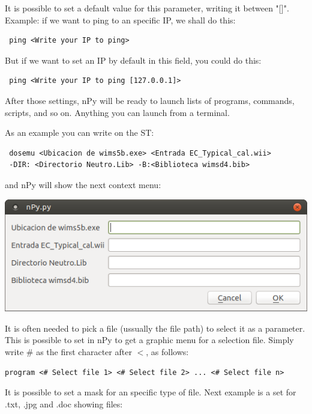 \documentclass[a4paper,10pt]{article}
\begin{document}
It is possible to set a default value for this parameter, writing it between "[]". 
Example: if we want to ping to an specific IP, we shall do this:

\begin{verbatim}
 ping <Write your IP to ping>
\end{verbatim}
 
But if we want to set an IP by default in this field, you could do this:

\begin{verbatim}
 ping <Write your IP to ping [127.0.0.1]>
\end{verbatim}

\bigskip 

After those settings, nPy will be ready to launch lists of programs, commands, scripts, and so on. Anything you can launch from a terminal.

\bigskip 

\noindent As an example you can write on the ST:
\begin{verbatim}
 dosemu <Ubicacion de wims5b.exe> <Entrada EC_Typical_cal.wii> 
 -DIR: <Directorio Neutro.Lib> -B:<Biblioteca wimsd4.bib>
 \end{verbatim}
 
 \noindent and nPy will show the next context menu:
\begin{center}
 \includegraphics[width=\textwidth]{img/contextMenuString.png}
\end{center}

\bigskip 

It is often needed to pick a file (ussually the file path) to select it as a parameter. This is possible to set in nPy to get a graphic menu for a selection file. Simply write $\#$ as the first character after $<$, as follows: 

\begin{verbatim}
program <# Select file 1> <# Select file 2> ... <# Select file n>
 \end{verbatim}

It is possible to set a mask for an specific type of file. Next example is a set for .txt, .jpg and .doc showing files:
\end{document}
